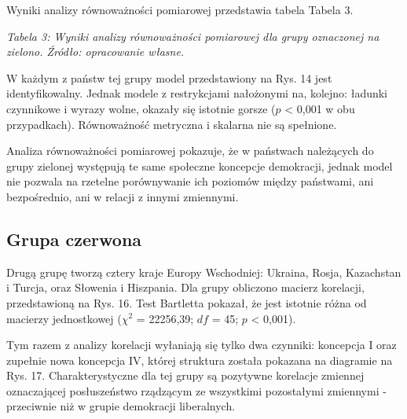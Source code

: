 \documentclass[12pt]{article}
\begin{document}
Wyniki analizy równoważności pomiarowej przedstawia tabela Tabela 3.

\emph{Tabela 3: Wyniki analizy równoważności pomiarowej dla grupy oznaczonej na zielono. Źródło: opracowanie własne.}

\begin{table}[H]
\centering
{}
\end{table}

W każdym z państw tej grupy model przedstawiony na Rys. 14 jest identyfikowalny. Jednak modele z restrykcjami nałożonymi na, kolejno: ładunki czynnikowe i wyrazy wolne, okazały się istotnie gorsze (\(p\) \textless{} 0,001 w obu przypadkach). Równoważność metryczna i skalarna nie są spełnione.

Analiza równoważności pomiarowej pokazuje, że w państwach należących do grupy zielonej występują te same społeczne koncepcje demokracji, jednak model nie pozwala na rzetelne porównywanie ich poziomów między państwami, ani bezpośrednio, ani w relacji z innymi zmiennymi.

\hypertarget{grupa-czerwona}{%
\subsection{Grupa czerwona}\label{grupa-czerwona}}

Drugą grupę tworzą cztery kraje Europy Wschodniej: Ukraina, Rosja, Kazachstan i Turcja, oraz Słowenia i Hiszpania. Dla grupy obliczono macierz korelacji, przedstawioną na Rys. 16. Test Bartletta pokazał, że jest istotnie różna od macierzy jednostkowej (\(\chi^2\) = 22256,39; \(df\) = 45; \(p\) \textless{} 0,001).

Tym razem z analizy korelacji wyłaniają się tylko dwa czynniki: koncepcja I oraz zupełnie nowa koncepcja IV, której struktura została pokazana na diagramie na Rys. 17. Charakterystyczne dla tej grupy są pozytywne korelacje zmiennej oznaczającej posłuszeństwo rządzącym ze wszystkimi pozostałymi zmiennymi - przeciwnie niż w grupie demokracji liberalnych.
\end{document}
